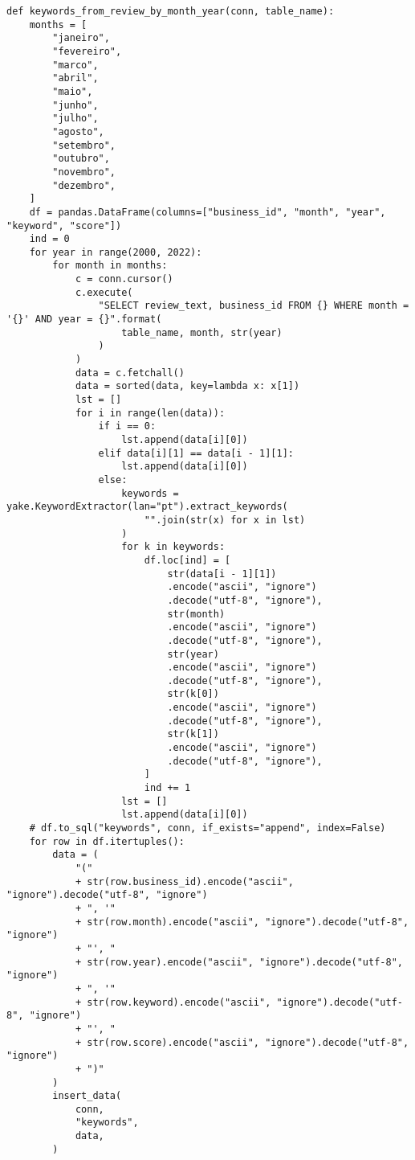 \begin{verbatim}
def keywords_from_review_by_month_year(conn, table_name):
    months = [
        "janeiro",
        "fevereiro",
        "marco",
        "abril",
        "maio",
        "junho",
        "julho",
        "agosto",
        "setembro",
        "outubro",
        "novembro",
        "dezembro",
    ]
    df = pandas.DataFrame(columns=["business_id", "month", "year", "keyword", "score"])
    ind = 0
    for year in range(2000, 2022):
        for month in months:
            c = conn.cursor()
            c.execute(
                "SELECT review_text, business_id FROM {} WHERE month = '{}' AND year = {}".format(
                    table_name, month, str(year)
                )
            )
            data = c.fetchall()
            data = sorted(data, key=lambda x: x[1])
            lst = []
            for i in range(len(data)):
                if i == 0:
                    lst.append(data[i][0])
                elif data[i][1] == data[i - 1][1]:
                    lst.append(data[i][0])
                else:
                    keywords = yake.KeywordExtractor(lan="pt").extract_keywords(
                        "".join(str(x) for x in lst)
                    )
                    for k in keywords:
                        df.loc[ind] = [
                            str(data[i - 1][1])
                            .encode("ascii", "ignore")
                            .decode("utf-8", "ignore"),
                            str(month)
                            .encode("ascii", "ignore")
                            .decode("utf-8", "ignore"),
                            str(year)
                            .encode("ascii", "ignore")
                            .decode("utf-8", "ignore"),
                            str(k[0])
                            .encode("ascii", "ignore")
                            .decode("utf-8", "ignore"),
                            str(k[1])
                            .encode("ascii", "ignore")
                            .decode("utf-8", "ignore"),
                        ]
                        ind += 1
                    lst = []
                    lst.append(data[i][0])
    # df.to_sql("keywords", conn, if_exists="append", index=False)
    for row in df.itertuples():
        data = (
            "("
            + str(row.business_id).encode("ascii", "ignore").decode("utf-8", "ignore")
            + ", '"
            + str(row.month).encode("ascii", "ignore").decode("utf-8", "ignore")
            + "', "
            + str(row.year).encode("ascii", "ignore").decode("utf-8", "ignore")
            + ", '"
            + str(row.keyword).encode("ascii", "ignore").decode("utf-8", "ignore")
            + "', "
            + str(row.score).encode("ascii", "ignore").decode("utf-8", "ignore")
            + ")"
        )
        insert_data(
            conn,
            "keywords",
            data,
        )



\end{verbatim}
